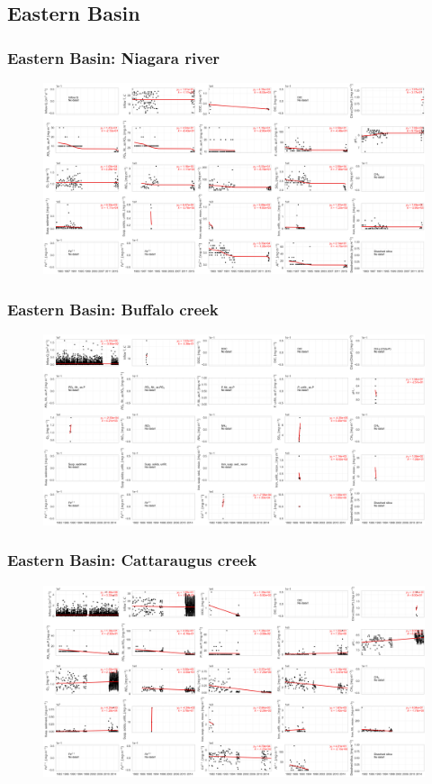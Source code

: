 \documentclass{beamer}
\begin{document}
\subsection{Eastern Basin}
\label{sub:eastern_basin}


\begin{frame}
\frametitle{Eastern Basin: Niagara river}

\begin{figure}
\includegraphics[width=\textwidth]{rivers/Western basin/niagarariver.png}
\end{figure}

\end{frame}

\begin{frame}
\frametitle{Eastern Basin: Buffalo creek}

\begin{figure}
\includegraphics[width=\textwidth]{rivers/Eastern basin/Buffalocreek.png}
\end{figure}

\end{frame}

\begin{frame}
\frametitle{Eastern Basin: Cattaraugus creek}

\begin{figure}
\includegraphics[width=\textwidth]{rivers/Eastern basin/cattarauguscreek.png}
\end{figure}

\end{frame}
\end{document}
